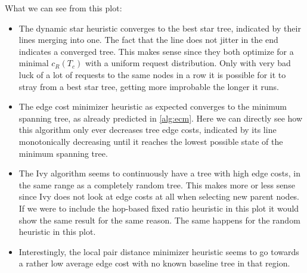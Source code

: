 \documentclass[a4paper, oneside]{discothesis}
\begin{document}

What we can see from this plot:
\begin{itemize}
\item The dynamic star heuristic converges to the best star tree, indicated by their lines merging into one. The fact that the line does not jitter in the end indicates a converged tree. This makes sense since they both optimize for a minimal $c_R(T_c)$ with a uniform request distribution. Only with very bad luck of a lot of requests to the same nodes in a row it is possible for it to stray from a best star tree, getting more improbable the longer it runs.
\item The edge cost minimizer heuristic as expected converges to the minimum spanning tree, as already predicted in \autoref{alg:ecm}. Here we can directly see how this algorithm only ever decreases tree edge costs, indicated by its line monotonically decreasing until it reaches the lowest possible state of the minimum spanning tree.
\item The Ivy algorithm seems to continuously have a tree with high edge costs, in the same range as a completely random tree. This makes more or less sense since Ivy does not look at edge costs at all when selecting new parent nodes. If we were to include the hop-based fixed ratio heuristic in this plot it would show the same result for the same reason. The same happens for the random heuristic in this plot.
\item Interestingly, the local pair distance minimizer heuristic seems to go towards a rather low average edge cost with no known baseline tree in that region.
\end{itemize}
\end{document}

